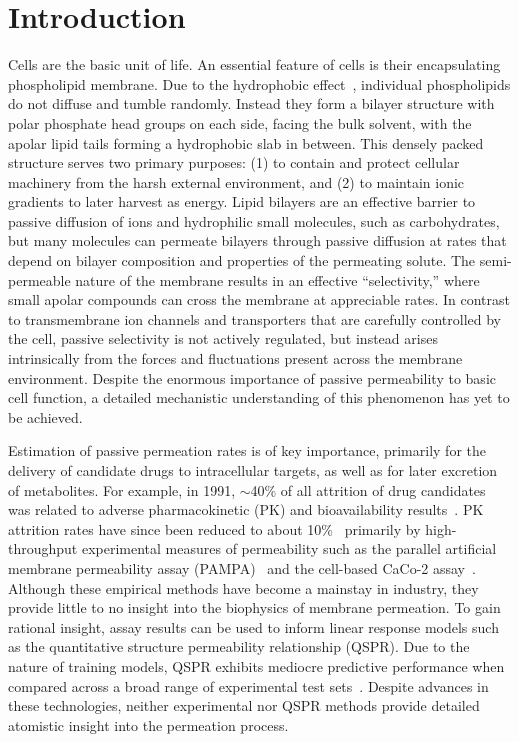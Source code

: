 %
\section{Introduction}
\par Cells are the basic unit of life. An essential feature of cells is their encapsulating phospholipid membrane. Due to the hydrophobic effect~\cite{Tanford1979,Tanford1973}, individual phospholipids do not diffuse and tumble randomly.  Instead they form a bilayer structure with polar phosphate head groups on each side, facing the bulk solvent, with the apolar lipid tails forming a hydrophobic slab in between. This densely packed structure serves two primary purposes: (1) to contain and protect cellular machinery from the harsh external environment, and (2) to maintain ionic gradients to later harvest as energy. Lipid bilayers are an effective barrier to passive diffusion of ions and hydrophilic small molecules, such as carbohydrates, but many molecules can permeate bilayers through passive diffusion at rates that depend on bilayer composition and properties of the permeating solute. The semi-permeable nature of the membrane results in an effective ``selectivity,'' where small apolar compounds can cross the membrane at appreciable rates. In contrast to transmembrane ion channels and transporters that are carefully controlled by the cell, passive selectivity is not actively regulated, but instead arises intrinsically from the forces and fluctuations present across the membrane environment. Despite the enormous importance of passive permeability to basic cell function, a detailed mechanistic understanding of this phenomenon has yet to be achieved.

\par Estimation of passive permeation rates is of key importance, primarily for the delivery of candidate drugs to intracellular targets, as well as for later excretion of metabolites. For example, in 1991, $\sim$40\% of all  attrition of  drug candidates was related to adverse pharmacokinetic (PK) and bioavailability results~\cite{Kola2004}. PK attrition rates have since been reduced to about 10\%~\cite{Tsaioun2009} primarily by high-throughput experimental measures of permeability such as the parallel artificial membrane permeability assay (PAMPA)~\cite{Kansy1998,Avdeef2005} and the cell-based CaCo-2 assay~\cite{Artursson2001,VanBreemen2005}. Although these empirical methods have become a mainstay in industry, they provide little to no insight into the biophysics of membrane permeation. To gain rational insight, assay results can be used to inform linear response models such as the quantitative structure permeability relationship (QSPR)\cite{Hansch1972,Hansch1969}. Due to the nature of training models, QSPR exhibits mediocre predictive performance when compared across a broad range of experimental test sets~\cite{Stouch2003,Swift2013}. Despite advances in these technologies, neither experimental nor QSPR methods provide detailed atomistic insight into the permeation process.

